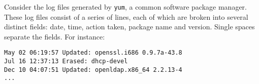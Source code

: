 
Consider
the log files generated by {\tt yum}, a common software package manager.
These log files consist of a series of lines,
each of which are broken into several distinct fields: 
date, time, action taken, package name and version. 
Single spaces separate the fields.  For instance:
{\small\begin{verbatim}
May 02 06:19:57 Updated: openssl.i686 0.9.7a-43.8
Jul 16 12:37:13 Erased: dhcp-devel
Dec 10 04:07:51 Updated: openldap.x86_64 2.2.13-4
...
\end{verbatim}}
\normalsize
%
%
%

